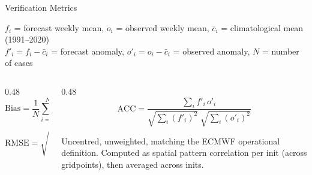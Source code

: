 \documentclass[aspectratio=169]{beamer}
\begin{document}
\begin{frame}{Verification Metrics}

    \vspace{-0.3em}

    {\footnotesize
    $f_i$ = forecast weekly mean, \quad
    $o_i$ = observed weekly mean, \quad
    $\bar{c}_i$ = climatological mean (1991--2020) \\[0.3em]
    $f'_i = f_i - \bar{c}_i$ = forecast anomaly, \quad
    $o'_i = o_i - \bar{c}_i$ = observed anomaly, \quad
    $N$ = number of cases
    }

    \vspace{0.5em}

    \begin{columns}[T]
    \begin{column}{0.48\textwidth}
        \[
        \mathrm{Bias} = \frac{1}{N}\sum_{i=1}^{N} (f_i - o_i)
        \]

        \[
        \mathrm{RMSE} = \sqrt{\frac{1}{N}\sum_{i=1}^{N} (f_i - o_i)^2}
        \]
    \end{column}

    \begin{column}{0.48\textwidth}
        \[
        \mathrm{ACC} = \frac{\displaystyle\sum_{i} f'_i \, o'_i}
        {\sqrt{\displaystyle\sum_{i} (f'_i)^2} \;\sqrt{\displaystyle\sum_{i} (o'_i)^2}}
        \]

        \vspace{0.3em}
        {\scriptsize
        Uncentred, unweighted, matching the ECMWF operational definition.
        Computed as spatial pattern correlation per init (across gridpoints),
        then averaged across inits.}
    \end{column}
    \end{columns}

\end{frame}
\end{document}
